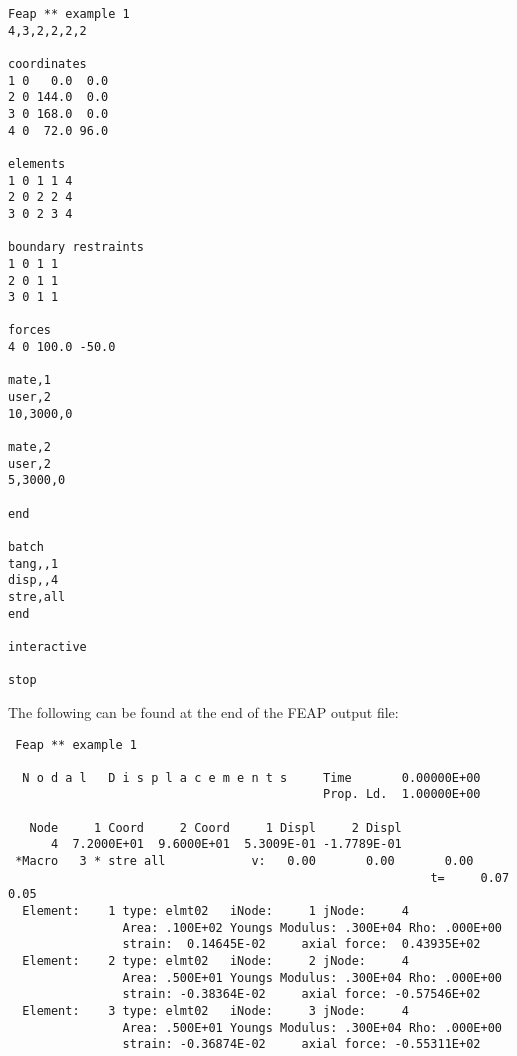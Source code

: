 \documentclass[12pt]{article}
\begin{document}
{\sf\small \begin{verbatim}
Feap ** example 1
4,3,2,2,2,2

coordinates
1 0   0.0  0.0
2 0 144.0  0.0
3 0 168.0  0.0
4 0  72.0 96.0

elements
1 0 1 1 4
2 0 2 2 4
3 0 2 3 4

boundary restraints
1 0 1 1
2 0 1 1
3 0 1 1

forces
4 0 100.0 -50.0

mate,1
user,2
10,3000,0

mate,2
user,2
5,3000,0

end

batch
tang,,1
disp,,4
stre,all
end

interactive

stop
\end{verbatim}}

\pagebreak
The following can be found at the end of the FEAP output file:
{\sf\small \begin{verbatim}
 Feap ** example 1                                                             

  N o d a l   D i s p l a c e m e n t s     Time       0.00000E+00
                                            Prop. Ld.  1.00000E+00

   Node     1 Coord     2 Coord     1 Displ     2 Displ
      4  7.2000E+01  9.6000E+01  5.3009E-01 -1.7789E-01
 *Macro   3 * stre all            v:   0.00       0.00       0.00    
                                                           t=     0.07     0.05
  Element:    1 type: elmt02   iNode:     1 jNode:     4
                Area: .100E+02 Youngs Modulus: .300E+04 Rho: .000E+00
                strain:  0.14645E-02     axial force:  0.43935E+02
  Element:    2 type: elmt02   iNode:     2 jNode:     4
                Area: .500E+01 Youngs Modulus: .300E+04 Rho: .000E+00
                strain: -0.38364E-02     axial force: -0.57546E+02
  Element:    3 type: elmt02   iNode:     3 jNode:     4
                Area: .500E+01 Youngs Modulus: .300E+04 Rho: .000E+00
                strain: -0.36874E-02     axial force: -0.55311E+02
\end{verbatim}}
\end{document}
